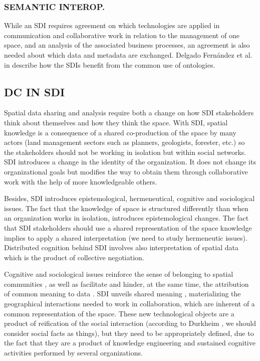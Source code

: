 \documentclass[10pt,twocolumn,ieeetran]{article}
\begin{document}
\subsubsection{SEMANTIC INTEROP.}
While an SDI requires agreement on which technologies are applied in communication and collaborative work in relation to the management of one space, and an analysis of the associated business processes, an agreement is also needed about which data and metadata are exchanged. Delgado Fern\' andez et al. in \cite{Delgado} describe how the SDIs benefit from the common use of ontologies. 



\subsection{DC IN SDI}

Spatial data sharing and analysis require both a change on how SDI stakeholders think about themselves and how they think the space. With SDI, spatial knowledge is a consequence of a shared
co-production of the space by many actors (land management sectors such as planners, geologists, forester, etc.) so the stakeholders should not be working in isolation but within social networks. SDI introduces a change
in the identity of the organization. It does not change its organizational goals but modifies the way to obtain them through collaborative work with the help of more knowledgeable others.

Besides, SDI introduces epistemological, hermeneutical, cognitive and sociological issues. The fact that the knowledge of space is structured differently than when an organization works in isolation, introduces epistemological changes. The fact that SDI stakeholders should use a shared representation of the space knowledge implies to apply a shared interpretation (we need to study hermeneutic issues). Distributed cognition behind SDI involves also interpretation of spatial data which is the product of collective negotiation. 


Cognitive and sociological issues reinforce the sense of belonging to spatial communities \cite{Noucher2}, as well as facilitate and hinder, at the same time, the attribution of common meaning to data \cite{Noucher1}.
SDI unveils shared meaning \cite{Noucher1}, materializing the geographical interactions needed to work in collaboration, which are inherent of a common representation of the space. 
These new technological objects are a product of reification of the social interaction (according to Durkheim \cite{Durkheim}, we should consider social facts as things), but they need to be appropriately defined, due to the fact that they are a product of  knowledge engineering and sustained cognitive activities performed by several organizations. 
\end{document}
